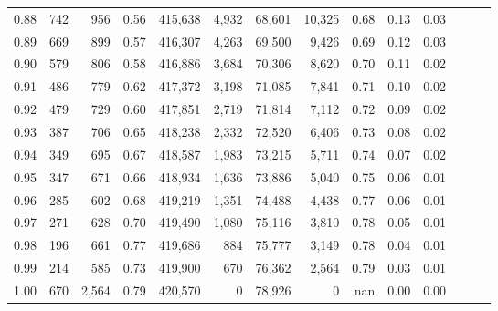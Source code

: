 \begin{tabular}{rrrrrrrrrrrrrr}
0.88 &     742 &    956 &  0.56 &  415,638 &    4,932 &  68,601 &  10,325 &  0.68 &  0.13 &      0.03 \\
0.89 &     669 &    899 &  0.57 &  416,307 &    4,263 &  69,500 &   9,426 &  0.69 &  0.12 &      0.03 \\
0.90 &     579 &    806 &  0.58 &  416,886 &    3,684 &  70,306 &   8,620 &  0.70 &  0.11 &      0.02 \\
0.91 &     486 &    779 &  0.62 &  417,372 &    3,198 &  71,085 &   7,841 &  0.71 &  0.10 &      0.02 \\
0.92 &     479 &    729 &  0.60 &  417,851 &    2,719 &  71,814 &   7,112 &  0.72 &  0.09 &      0.02 \\
0.93 &     387 &    706 &  0.65 &  418,238 &    2,332 &  72,520 &   6,406 &  0.73 &  0.08 &      0.02 \\
0.94 &     349 &    695 &  0.67 &  418,587 &    1,983 &  73,215 &   5,711 &  0.74 &  0.07 &      0.02 \\
0.95 &     347 &    671 &  0.66 &  418,934 &    1,636 &  73,886 &   5,040 &  0.75 &  0.06 &      0.01 \\
0.96 &     285 &    602 &  0.68 &  419,219 &    1,351 &  74,488 &   4,438 &  0.77 &  0.06 &      0.01 \\
0.97 &     271 &    628 &  0.70 &  419,490 &    1,080 &  75,116 &   3,810 &  0.78 &  0.05 &      0.01 \\
0.98 &     196 &    661 &  0.77 &  419,686 &      884 &  75,777 &   3,149 &  0.78 &  0.04 &      0.01 \\
0.99 &     214 &    585 &  0.73 &  419,900 &      670 &  76,362 &   2,564 &  0.79 &  0.03 &      0.01 \\
1.00 &     670 &  2,564 &  0.79 &  420,570 &        0 &  78,926 &       0 &   nan &  0.00 &      0.00 \\
\bottomrule
\end{tabular}
